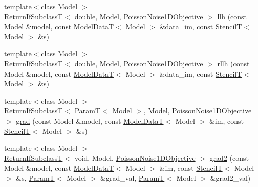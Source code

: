 \begin{DoxyCompactItemize}
\item 
{\footnotesize template$<$class Model $>$ }\\\hyperlink{namespacemappel_a3b77d227658ba3ba9e16fea6fa6e626d}{Return\+If\+SubclassT}$<$ double, Model, \hyperlink{classmappel_1_1PoissonNoise1DObjective}{Poisson\+Noise1\+D\+Objective} $>$ \hyperlink{namespacemappel_1_1methods_1_1likelihood_a447a9c4b4bdcd45bed3f2df281efc5a5}{llh} (const Model \&model, const \hyperlink{namespacemappel_a97f050df953605381ae9c901c3b125f1}{Model\+DataT}$<$ Model $>$ \&data\+\_\+im, const \hyperlink{namespacemappel_a3a06598240007876f8c4bf834ad86197}{StencilT}$<$ Model $>$ \&s)
\item 
{\footnotesize template$<$class Model $>$ }\\\hyperlink{namespacemappel_a3b77d227658ba3ba9e16fea6fa6e626d}{Return\+If\+SubclassT}$<$ double, Model, \hyperlink{classmappel_1_1PoissonNoise1DObjective}{Poisson\+Noise1\+D\+Objective} $>$ \hyperlink{namespacemappel_1_1methods_1_1likelihood_ae064b0a1e26a5626c62bde870e587ecb}{rllh} (const Model \&model, const \hyperlink{namespacemappel_a97f050df953605381ae9c901c3b125f1}{Model\+DataT}$<$ Model $>$ \&data\+\_\+im, const \hyperlink{namespacemappel_a3a06598240007876f8c4bf834ad86197}{StencilT}$<$ Model $>$ \&s)
\item 
{\footnotesize template$<$class Model $>$ }\\\hyperlink{namespacemappel_a3b77d227658ba3ba9e16fea6fa6e626d}{Return\+If\+SubclassT}$<$ \hyperlink{namespacemappel_a667925cb0d6c0e49f2f035cc5a9a6857}{ParamT}$<$ Model $>$, Model, \hyperlink{classmappel_1_1PoissonNoise1DObjective}{Poisson\+Noise1\+D\+Objective} $>$ \hyperlink{namespacemappel_1_1methods_1_1likelihood_aceae29ce5d5dba7482b49d2ec12d0392}{grad} (const Model \&model, const \hyperlink{namespacemappel_a97f050df953605381ae9c901c3b125f1}{Model\+DataT}$<$ Model $>$ \&im, const \hyperlink{namespacemappel_a3a06598240007876f8c4bf834ad86197}{StencilT}$<$ Model $>$ \&s)
\item 
{\footnotesize template$<$class Model $>$ }\\\hyperlink{namespacemappel_a3b77d227658ba3ba9e16fea6fa6e626d}{Return\+If\+SubclassT}$<$ void, Model, \hyperlink{classmappel_1_1PoissonNoise1DObjective}{Poisson\+Noise1\+D\+Objective} $>$ \hyperlink{namespacemappel_1_1methods_1_1likelihood_a5417cc44455daa0eb6a6b307b1f493a1}{grad2} (const Model \&model, const \hyperlink{namespacemappel_a97f050df953605381ae9c901c3b125f1}{Model\+DataT}$<$ Model $>$ \&im, const \hyperlink{namespacemappel_a3a06598240007876f8c4bf834ad86197}{StencilT}$<$ Model $>$ \&s, \hyperlink{namespacemappel_a667925cb0d6c0e49f2f035cc5a9a6857}{ParamT}$<$ Model $>$ \&grad\+\_\+val, \hyperlink{namespacemappel_a667925cb0d6c0e49f2f035cc5a9a6857}{ParamT}$<$ Model $>$ \&grad2\+\_\+val)

\end{DoxyCompactItemize}
